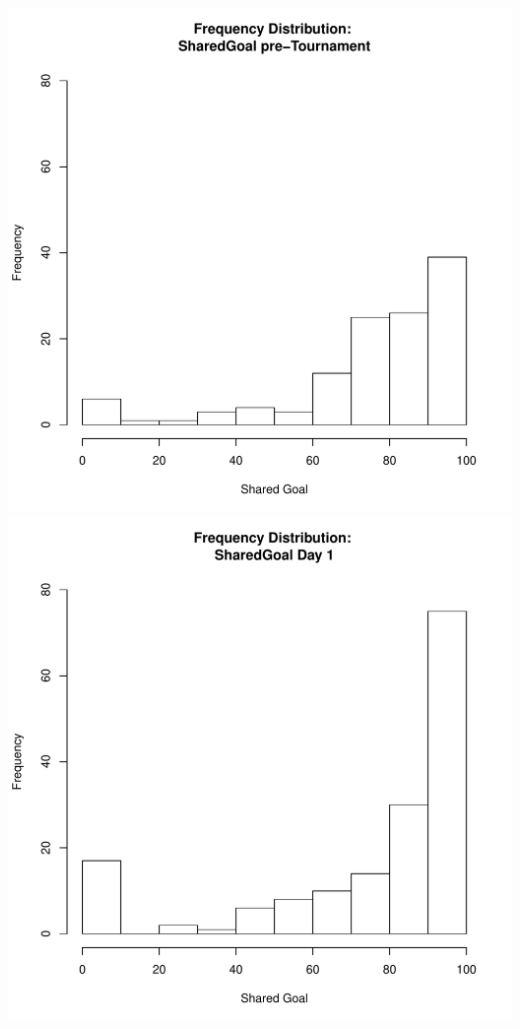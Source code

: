 \documentclass[12pt]{report}
\begin{document}
\clearpage
\includegraphics[scale =.4]{../images/distSharedGoalPre.pdf}
\includegraphics[scale =.4]{../images/distSharedGoalDay1.pdf}
\end{document}
